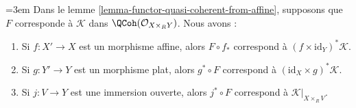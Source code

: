 \begin{lemma}
\label{lemma-functor-quasi-coherent-from-affine-compose}
\begingroup\emergencystretch=3em
Dans le lemme \ref{lemma-functor-quasi-coherent-from-affine}, supposons que $F$
corresponde à $\mathcal{K}$ dans $\QCoh(\mathcal{O}_{X \times_R Y})$.
Nous avons :\par\endgroup
\begin{enumerate}
\item Si $f : X' \to X$ est un morphisme affine, alors $F \circ f_*$
correspond à $(f \times \text{id}_Y)^*\mathcal{K}$.
\item Si $g : Y' \to Y$ est un morphisme plat, alors $g^* \circ F$ correspond à
$(\text{id}_X \times g)^*\mathcal{K}$.
\item Si $j : V \to Y$ est une immersion ouverte, alors $j^* \circ F$
correspond à $\mathcal{K}|_{X \times_R V}$.
\end{enumerate}
\end{lemma}

